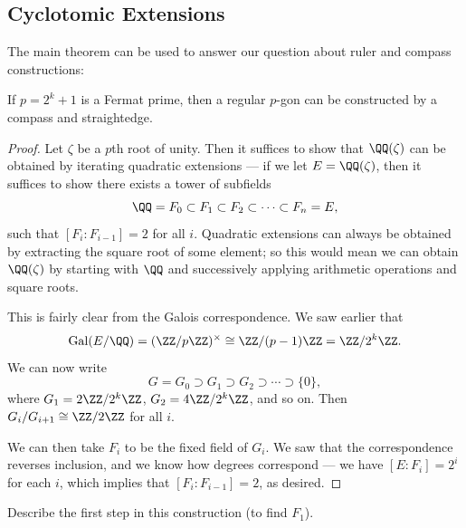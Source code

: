 \subsection{Cyclotomic Extensions}

The main theorem can be used to answer our question about ruler and compass constructions:

\begin{proposition}
    If $p = 2^k + 1$ is a Fermat prime, then a regular $p$-gon can be constructed by a compass and straightedge. 
\end{proposition}

\begin{proof}
    Let $\zeta$ be a $p$th root of unity. Then it suffices to show that $\QQ(\zeta)$ can be obtained by iterating quadratic extensions --- if we let $E = \QQ(\zeta)$, then it suffices to show there exists a tower of subfields \[\QQ = F_0 \subset F_1 \subset F_2 \subset \cdots \subset F_n = E,\] such that $[F_i : F_{i - 1}] = 2$ for all $i$. Quadratic extensions can always be obtained by extracting the square root of some element; so this would mean we can obtain $\QQ(\zeta)$ by starting with $\QQ$ and successively applying arithmetic operations and square roots.
    
    This is fairly clear from the Galois correspondence. We saw earlier that \[\operatorname{Gal}(E/\QQ) = (\ZZ/p\ZZ)^\times \cong \ZZ/(p - 1)\ZZ = \ZZ/2^k\ZZ.\] We can now write \[G = G_0 \supset G_1 \supset G_2 \supset \cdots \supset \{0\},\] where $G_1 = 2\ZZ/2^k\ZZ$, $G_2 = 4\ZZ/2^k\ZZ$, and so on. Then $G_i/G_{i + 1} \cong \ZZ/2\ZZ$ for all $i$. 
    
    We can then take $F_i$ to be the fixed field of $G_i$. We saw that the correspondence reverses inclusion, and we know how degrees correspond --- we have $[E : F_i] = 2^i$ for each $i$, which implies that $[F_i : F_{i - 1}] = 2$, as desired. 
\end{proof}

\begin{example}
    Describe the first step in this construction (to find $F_1$). 
\end{example}

